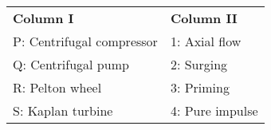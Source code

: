 \begin{tabular}{ll}
	\textbf{Column I} & \textbf{Column II}\\
	P:  Centrifugal compressor & 1:  Axial flow\\
	Q:  Centrifugal pump & 2:  Surging\\
	R:  Pelton wheel  & 3:  Priming\\
	S:  Kaplan turbine  & 4:  Pure impulse
\end{tabular}

